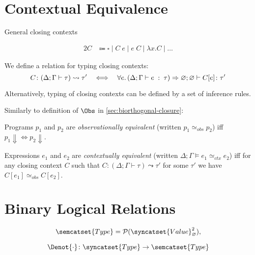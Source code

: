 \section{Contextual Equivalence}
\label{sec:ctx-equiv}

General closing contexts

\begin{alignat*}{2}
  C & \Coloneqq \square \mid C\;e \mid e\;C \mid \lambda x.C \mid \ldots
\end{alignat*}

We define a relation for typing closing contexts:
\[
  C \colon (\Delta; \Gamma \vdash \tau) \leadsto \tau'
    \quad\Longleftrightarrow\quad
    \forall e\ldotp (\Delta; \Gamma \vdash e \;:\;\tau) \Rightarrow
      \varnothing;\varnothing \vdash C[e] \colon \tau'
\]

Alternatively, typing of closing contexts can be defined by
a set of inference rules.

Similarly to definition of $\Obs$ in \autoref{sec:biorthogonal-closure}:

\begin{defin}
  Programs $p_1$ and $p_2$ are \emph{observationally equivalent}
  (written $p_1 \simeq_{obs} p_2$)
  iff $p_1 \Downarrow \iff p_2 \Downarrow$.
\end{defin}

\begin{defin}
  Expressions $e_1$ and $e_2$ are \emph{contextually equivalent}
  (written $\Delta; \Gamma \models e_1 \simeq_{ctx} e_2$)
  iff for any closing context $C$ such that $C : (\Delta;\Gamma\vdash\tau) \leadsto \tau'$
  for some $\tau'$
  we have $C[e_1] \simeq_{obs} C[e_2]$.
\end{defin}

\section{Binary Logical Relations}
\[
  \semcatset{Type} = \mathcal{P}(\syncatset{Value}_{\varnothing}^2),
\]

\[
  \Denot{\cdot} \colon \syncatset{Type} \to \semcatset{Type}
\]

